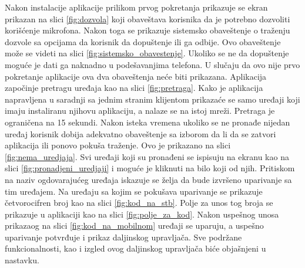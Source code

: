 \documentclass[implementacija.tex]{subfiles}
\begin{document}
Nakon instalacije aplikacije prilikom prvog pokretanja prikazuje se ekran prikazan na slici \ref{fig:dozvola} koji obaveštava korisnika da je potrebno dozvoliti korišćenje mikrofona. Nakon toga se prikazuje sistemsko obaveštenje o traženju dozvole sa opcijama da korisnik da dopuštenje ili ga odbije. Ovo obaveštenje može se videti na slici \ref{fig:sistemsko_obavestenje}. Ukoliko se ne da dopuštenje moguće je dati ga naknadno u podešavanjima telefona. U slučaju da ovo nije prvo pokretanje aplikacije ova dva obaveštenja neće biti prikazana. Aplikacija započinje pretragu uređaja kao na slici \ref{fig:pretraga}. Kako je aplikacija napravljena u saradnji sa jednim stranim klijentom prikazaće se samo uređaji koji imaju instaliranu njihovu aplikaciju, a nalaze se na istoj mreži. Pretraga je ograničena na 15 sekundi. Nakon isteka vremena ukoliko se ne pronađe nijedan uređaj korisnik dobija adekvatno obaveštenje sa izborom da li da se zatvori aplikacija ili ponovo pokuša traženje. Ovo je prikazano na slici \ref{fig:nema_uredjaja}. Svi uređaji koji su pronađeni se ispisuju na ekranu kao na slici \ref{fig:pronadjeni_uredjaji} i moguće je kliknuti na bilo koji od njih. Pritiskom na naziv ogdovarajućeg uređaja iskazuje se želja da bude izvršeno uparivanje sa tim uređajem. Na uređaju sa kojim se pokušava uparivanje se prikazuje četvorocifren broj kao na slici \ref{fig:kod_na_stb}. Polje za unos tog broja se prikazuje u aplikaciji kao na slici \ref{fig:polje_za_kod}. Nakon uspešnog unosa prikazaog na slici \ref{fig:kod_na_mobilnom} uređaji se uparuju, a uspešno uparivanje potvrđuje i prikaz daljinskog upravljača. Sve podržane funkcionalnosti, kao i izgled ovog daljinskog upravljača biće objašnjeni u nastavku. 
\end{document}
